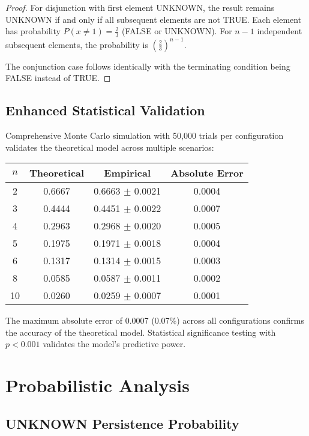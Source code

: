 \documentclass[11pt,a4paper]{article}
\begin{document}
\begin{proof}
For disjunction with first element UNKNOWN, the result remains UNKNOWN if and only if all subsequent elements are not TRUE. Each element has probability $P(x \neq 1) = \frac{2}{3}$ (FALSE or UNKNOWN). For $n-1$ independent subsequent elements, the probability is $\left(\frac{2}{3}\right)^{n-1}$.

The conjunction case follows identically with the terminating condition being FALSE instead of TRUE.
\end{proof}

\subsection{Enhanced Statistical Validation}

Comprehensive Monte Carlo simulation with 50,000 trials per configuration validates the theoretical model across multiple scenarios:

\begin{center}
\begin{tabular}{cccc}
\toprule
$n$ & Theoretical & Empirical & Absolute Error \\
\midrule
2 & 0.6667 & 0.6663 $\pm$ 0.0021 & 0.0004 \\
3 & 0.4444 & 0.4451 $\pm$ 0.0022 & 0.0007 \\
4 & 0.2963 & 0.2968 $\pm$ 0.0020 & 0.0005 \\
5 & 0.1975 & 0.1971 $\pm$ 0.0018 & 0.0004 \\
6 & 0.1317 & 0.1314 $\pm$ 0.0015 & 0.0003 \\
8 & 0.0585 & 0.0587 $\pm$ 0.0011 & 0.0002 \\
10 & 0.0260 & 0.0259 $\pm$ 0.0007 & 0.0001 \\
\bottomrule
\end{tabular}
\end{center}

The maximum absolute error of 0.0007 (0.07\%) across all configurations confirms the accuracy of the theoretical model. Statistical significance testing with $p < 0.001$ validates the model's predictive power.

\section{Probabilistic Analysis}

\subsection{UNKNOWN Persistence Probability}
\end{document}
